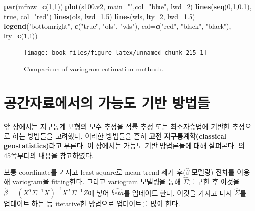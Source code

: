\documentclass[b5paper,]{scrbook}
\makeatletter
\newenvironment{Shaded}{\begin{snugshade}}{\end{snugshade}}
\newcommand{\KeywordTok}[1]{\textcolor[rgb]{0.13,0.29,0.53}{\textbf{{#1}}}}
\newcommand{\DataTypeTok}[1]{\textcolor[rgb]{0.13,0.29,0.53}{{#1}}}
\newcommand{\DecValTok}[1]{\textcolor[rgb]{0.00,0.00,0.81}{{#1}}}
\newcommand{\FloatTok}[1]{\textcolor[rgb]{0.00,0.00,0.81}{{#1}}}
\newcommand{\StringTok}[1]{\textcolor[rgb]{0.31,0.60,0.02}{{#1}}}
\newcommand{\NormalTok}[1]{{#1}}
\theoremstyle{plain}
\theoremstyle{definition}
\numberwithin{equation}{section}
\newenvironment{kframe}{%
\medskip{}
\setlength{\fboxsep}{.8em}
 \def\at@end@of@kframe{}%
 \ifinner\ifhmode%
  \def\at@end@of@kframe{\end{minipage}}%
  \begin{minipage}{\columnwidth}%
 \fi\fi%
 \def\FrameCommand##1{\hskip\@totalleftmargin \hskip-\fboxsep
 \colorbox{shadecolor}{##1}\hskip-\fboxsep
     \hskip-\linewidth \hskip-\@totalleftmargin \hskip\columnwidth}%
 \MakeFramed {\advance\hsize-\width
   \@totalleftmargin\z@ \linewidth\hsize
   \@setminipage}}%
 {\par\unskip\endMakeFramed%
 \at@end@of@kframe}
\renewenvironment{Shaded}{\begin{kframe}}{\end{kframe}}
\makeatother
\begin{document}
\begin{Shaded}
\begin{Highlighting}[]
\KeywordTok{par}\NormalTok{(}\DataTypeTok{mfrow=}\KeywordTok{c}\NormalTok{(}\DecValTok{1}\NormalTok{,}\DecValTok{1}\NormalTok{))}
\KeywordTok{plot}\NormalTok{(s100.v2, }\DataTypeTok{main=}\StringTok{""}\NormalTok{,}\DataTypeTok{col=}\StringTok{"blue"}\NormalTok{, }\DataTypeTok{lwd=}\DecValTok{2}\NormalTok{)}
\KeywordTok{lines}\NormalTok{(}\KeywordTok{seq}\NormalTok{(}\DecValTok{0}\NormalTok{,}\DecValTok{1}\NormalTok{,}\FloatTok{0.1}\NormalTok{), true, }\DataTypeTok{col=}\StringTok{"red"}\NormalTok{)}
\KeywordTok{lines}\NormalTok{(ols, }\DataTypeTok{lwd=}\FloatTok{1.5}\NormalTok{)}
\KeywordTok{lines}\NormalTok{(wls, }\DataTypeTok{lty=}\DecValTok{2}\NormalTok{, }\DataTypeTok{lwd=}\FloatTok{1.5}\NormalTok{)}
\KeywordTok{legend}\NormalTok{(}\StringTok{"bottomright"}\NormalTok{, }\KeywordTok{c}\NormalTok{(}\StringTok{"true"}\NormalTok{, }\StringTok{"ols"}\NormalTok{, }\StringTok{"wls"}\NormalTok{),}
       \DataTypeTok{col=}\KeywordTok{c}\NormalTok{(}\StringTok{"red"}\NormalTok{, }\StringTok{"black"}\NormalTok{, }\StringTok{"black"}\NormalTok{), }\DataTypeTok{lty=}\KeywordTok{c}\NormalTok{(}\DecValTok{1}\NormalTok{,}\DecValTok{1}\NormalTok{))}
\end{Highlighting}
\end{Shaded}

\begin{figure}

{\centering \texttt{[image: book\_files/figure-latex/unnamed-chunk-215-1]} 

}

\caption{Comparison of variogram estimation methods.}\label{fig:unnamed-chunk-215}
\end{figure}

\chapter{공간자료에서의 가능도 기반 방법들}\label{spatlikelihood}

앞 장에서는 지구통계 모형의 모수 추정을 적률 추정 또는 최소자승법에
기반한 추정으로 하는 방법들을 고려했다. 이러한 방법들을 흔히
\textbf{고전 지구통계학(classical geostatistics)}라고 부른다. 이
장에서는 가능도 기반 방법론들에 대해 살펴본다. \citep{Gelfand2010}의
45쪽부터의 내용을 참고하였다.

보통 coordinate를 가지고 least square로 mean trend 제거
후(\(\hat{\beta}\) 모델링) 잔차를 이용해 variogram을 fitting한다. 그리고
variogram 모델링을 통해 \(\hat{\Sigma}\)를 구한 후 이것을
\(\hat{\beta}=(X^{T}\Sigma^{-1}X)^{-1}X^{T}\Sigma^{-1}Z\)에 넣어
\(\hat{beta}\)를 업데이트 한다. 이것을 가지고 다시 \(\hat{\Sigma}\)를
업데이트 하는 등 iterative한 방법으로 업데이트를 많이 한다.
\end{document}
